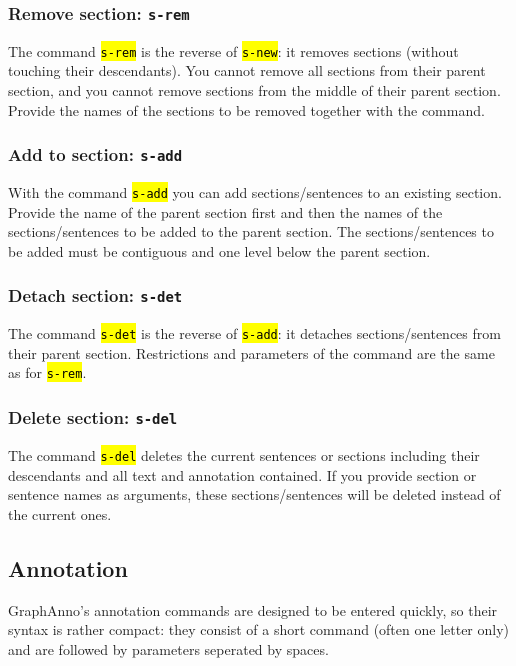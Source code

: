 \documentclass[12pt]{scrartcl}
\newcommand{\code}[1]{\hl{\texttt{#1}}}
\begin{document}
\subsubsection{Remove section: \texttt{s-rem}}

The command \code{s-rem} is the reverse of \code{s-new}: it removes sections (without touching their descendants).
You cannot remove all sections from their parent section, and you cannot remove sections from the middle of their parent section.
Provide the names of the sections to be removed together with the command.

\subsubsection{Add to section: \texttt{s-add}}

With the command \code{s-add} you can add sections/sentences to an existing section.
Provide the name of the parent section first and then the names of the sections/sentences to be added to the parent section.
The sections/sentences to be added must be contiguous and one level below the parent section.

\subsubsection{Detach section: \texttt{s-det}}

The command \code{s-det} is the reverse of \code{s-add}: it detaches sections/sentences from their parent section.
Restrictions and parameters of the command are the same as for \code{s-rem}.

\subsubsection{Delete section: \texttt{s-del}}

The command \code{s-del} deletes the current sentences or sections including their descendants and all text and annotation contained.
If you provide section or sentence names as arguments, these sections/sentences will be deleted instead of the current ones.


\subsection{Annotation}\label{annotationsbefehle}

GraphAnno’s annotation commands are designed to be entered quickly, so their syntax is rather compact:
they consist of a short command (often one letter only) and are followed by parameters seperated by spaces.
\end{document}
